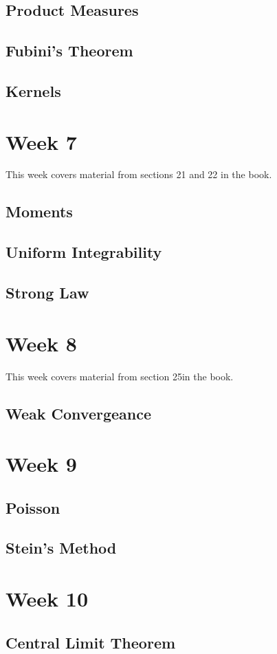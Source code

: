 \documentclass[12pt]{article}
\begin{document}
\subsection{Product Measures}

\subsection{Fubini's Theorem}

\subsection{Kernels}


\section{Week 7}
This week covers material from sections 21 and 22 in the book.

\subsection{Moments}

\subsection{Uniform Integrability}

\subsection{Strong Law}


\section{Week 8}
This week covers material from section 25in the book.

\subsection{Weak Convergeance}


\section{Week 9}

\subsection{Poisson}

\subsection{Stein's Method}


\section{Week 10}

\subsection{Central Limit Theorem}


\newpage
\begin{thebibliography}{99}

\end{thebibliography}
\end{document}
